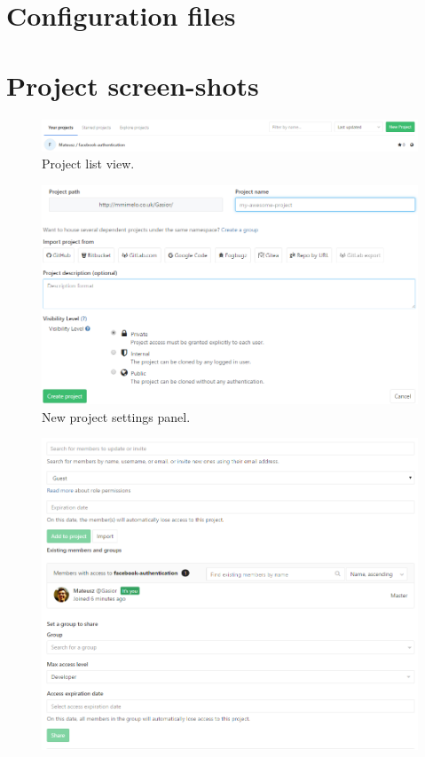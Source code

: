 \begin{appendix}
	\chapter{Configuration files}
		
		
	\chapter{Project screen-shots}
		\begin{figure}[!htbp]
			\centering
			\includegraphics[width=1\textwidth]{img/ug-project/new-project2}
			\caption{Project list view.}
			\label{fig:project-list-view}
		\end{figure}		
		\begin{figure}[!htbp]
			\centering
			\includegraphics[width=1\textwidth]{img/ug-project/new-project-settings}
			\caption{New project settings panel.}
			\label{fig:project-settings}
		\end{figure}
		\begin{figure}[!htbp]
			\centering
			\includegraphics[width=1\textwidth]{img/ug-project/project-members-permissions}

\end{figure}
\end{appendix}
